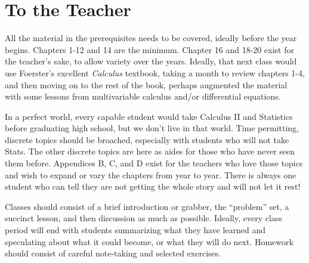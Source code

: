\section{To the Teacher}

All the material in the prerequisites needs to be covered, ideally before the year begins.  
Chapters 1-12 and 14 are the minimum.  Chapter 16 and 18-20 exist for the teacher's sake,
to allow variety over the years.  Ideally, that next class would use Foerster's excellent
\textit{Calculus} textbook, taking a month to review chapters 1-4, and then moving 
on to the rest of the book, perhaps augmented the material with some lessons from
multivariable calculus and/or differential equations.

In a perfect world, every capable student would take Calculus II and Statistics
before graduating high school, but we don't live in that world.  Time permitting, discrete
topics should be broached, especially with students who will not take Stats.  The other discrete topics
are here as aides for those who have never seen them before.  
Appendices B, C, and D exist for the teachers who love those topics and wish
to expand or vary the chapters from year to year.  There is always one student who can tell
they are not getting the whole story and will not let it rest!

Classes should consist of a brief introduction or grabber, the ``problem'' set, a succinct lesson, and then
discussion as much as possible.  Ideally, every class period will end with students summarizing what
they have learned and speculating about what it could become, or what they will do next.  Homework
should consist of careful note-taking and selected exercises.

